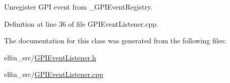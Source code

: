 Unregister G\-P\-I event from \-\_\-\-G\-P\-I\-Event\-Registry. 



Definition at line 36 of file G\-P\-I\-Event\-Listener.\-cpp.



The documentation for this class was generated from the following files\-:\begin{DoxyCompactItemize}
\item 
elfin\-\_\-src/\hyperlink{_g_p_i_event_listener_8h}{G\-P\-I\-Event\-Listener.\-h}\item 
elfin\-\_\-src/\hyperlink{_g_p_i_event_listener_8cpp}{G\-P\-I\-Event\-Listener.\-cpp}\end{DoxyCompactItemize}
